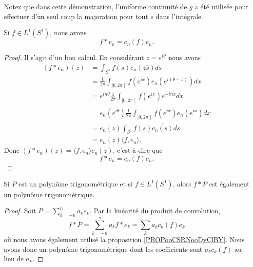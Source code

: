 Notez que dans cette démonstration, l'uniforme continuité de \( g\) a été utilisée pour effectuer d'un seul coup la majoration pour tout \( s\) dans l'intégrale.

\begin{proposition}     \label{PROPooCSRNooDyClBY}
	Si \( f\in L^1(S^1)\), nous avons
	\begin{equation}
		f*e_n=c_n(f)e_n.
	\end{equation}
\end{proposition}

\begin{proof}
	Il s'agit d'un bon calcul. En considérant \( z= e^{i\theta}\) nous avons
	\begin{subequations}
		\begin{align}
			(f*e_n)(z) & =\int_{S^1}f(s)e_n(z\bar s)ds                                                                                             \\
			           & =\frac{1}{ 2\pi }\int_{\mathopen\lbrack 0 , 2\pi \mathclose\lbrack}f( e^{ix})e_n(  e^{i(\theta-x)}) dx                    \\
			           & = e^{in\theta}\frac{1}{ 2\pi }\int_{\mathopen\lbrack 0 , 2\pi \mathclose\lbrack}f( e^{ix}) e^{-inx}dx                     \\
			           & =e_n( e^{i\theta})\frac{1}{ 2\pi }\int_{\mathopen\lbrack 0 , 2\pi \mathclose\lbrack}f( e^{ix})\overline{ e_n( e^{ix}) }dx \\
			           & =e_n(z)\int_{S^1}f(s)\overline{ e_n(s) }ds                                                                                \\
			           & =e_n(z)\langle f, e_n\rangle.
		\end{align}
	\end{subequations}
	Donc \( (f*e_n)(z)=\langle f, e_n\rangle e_n(z)\), c'est-à-dire que
	\begin{equation}
		f*e_n=c_n(f)e_n.
	\end{equation}
\end{proof}

\begin{lemma}       \label{LEMooDGHJooRAnwpy}
	Si \( P\) est un polynôme trigonométrique et si \( f\in L^1(S^1)\), alors \( f*P\) est également un polynôme trigonométrique.
\end{lemma}

\begin{proof}
	Soit \( P=\sum_{k=-n}^na_ke_k\). Par la linéarité du produit de convolution,
	\begin{equation}
		f*P=\sum_{k=-n}^na_kf*e_k=\sum_ka_kc_k(f)e_k
	\end{equation}
	où nous avons également utilisé la proposition \ref{PROPooCSRNooDyClBY}. Nous avons donc un polynôme trigonométrique dont les coefficients sont \( a_kc_k(f)\) au lieu de \( a_k\).
\end{proof}

